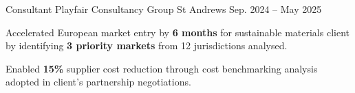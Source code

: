 \begin{cventries}
  \cventry
    {Consultant} %
    {Playfair Consultancy Group} %
    {St Andrews} %
    {Sep. 2024 -- May 2025} %
    {
      \begin{cvitems}
        \item {Accelerated European market entry by \textbf{6 months} for sustainable materials client by identifying \textbf{3 priority markets} from 12 jurisdictions analysed.}
        \item {Enabled \textbf{15\%} supplier cost reduction through cost benchmarking analysis adopted in client's partnership negotiations.}
      \end{cvitems}
    }

\end{cventries}
